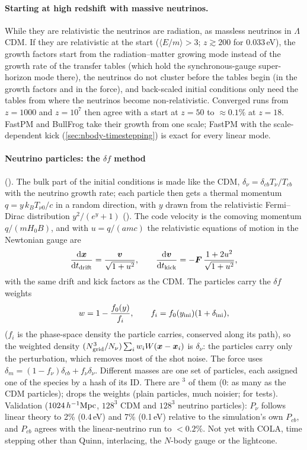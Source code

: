 \paragraph*{Starting at high redshift with massive neutrinos.} While they are relativistic the neutrinos are radiation,
as massless neutrinos in $\Lambda$CDM. If they are relativistic at the start ($\langle E/m\rangle>3$; $z\gtrsim200$ for
0.033\,eV), the growth factors start from the radiation--matter growing mode instead of the growth rate of the transfer
tables (which hold the synchronous-gauge super-horizon mode there), the neutrinos do not cluster before the tables
begin (in the growth factors and in the force), and back-scaled initial conditions only need the tables from where the
neutrinos become non-relativistic. Converged runs from $z=1000$ and $z=10^7$ then agree with a start at $z=50$ to
$\approx0.1\%$ at $z=18$. FastPM and BullFrog take their growth from one scale; FastPM with the scale-dependent kick
(\cref{sec:nbody-timestepping}) is exact for every linear mode.

\paragraph*{Neutrino particles: the $\delta f$ method} \cite{Elbers2021} (). The bulk part of
the initial conditions is made like the CDM, $\delta_\nu=\delta_{cb}T_\nu/T_{cb}$ with the neutrino growth rate; each
particle then gets a thermal momentum $q=y\,k_BT_{\nu0}/c$ in a random direction, with $y$ drawn from the relativistic
Fermi--Dirac distribution $y^2/(e^y+1)$ (). The code velocity is the comoving
momentum $q/(mH_0B)$, and with $u=q/(amc)$ the relativistic equations of motion in the Newtonian gauge are
\begin{equation}
\frac{\mathrm{d}\bm{x}}{\mathrm{d} t_{\rm drift}}=\frac{\bm v}{\sqrt{1+u^2}},\qquad
\frac{\mathrm{d}\bm v}{\mathrm{d} t_{\rm kick}}=-\bm F\,\frac{1+2u^2}{\sqrt{1+u^2}},
\end{equation}
with the same drift and kick factors as the CDM. The particles carry the $\delta f$ weights
\begin{equation}
w=1-\frac{f_0(y)}{f_i},\qquad f_i=f_0(y_{\rm ini})(1+\delta_{\rm ini}),
\end{equation}
($f_i$ is the phase-space density the particle carries, conserved along its path), so the weighted density
$(N_{\rm grid}^3/N_\nu)\sum_iw_iW(\bm{x}-\bm{x}_i)$ is $\delta_\nu$: the particles carry only the perturbation, which removes
most of the shot noise. The force uses $\delta_m=(1-f_\nu)\delta_{cb}+f_\nu\delta_\nu$. Different masses are one set of
particles, each assigned one of the species by a hash of its ID. There are $^3$ of
them (0: as many as the CDM particles);   drops the weights (plain
particles, much noisier; for tests). Validation ($1024\,h^{-1}\mathrm{Mpc}$, $128^3$ CDM and $128^3$
neutrino particles): $P_\nu$ follows linear theory to 2\% (0.4\,eV) and 7\% (0.1\,eV) relative to the simulation's own
$P_{cb}$, and $P_{cb}$ agrees with the linear-neutrino run to $<0.2\%$. Not yet with COLA, time stepping other than
Quinn, interlacing, the $N$-body gauge or the lightcone.

